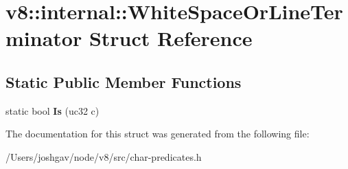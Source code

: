 \hypertarget{structv8_1_1internal_1_1_white_space_or_line_terminator}{}\section{v8\+:\+:internal\+:\+:White\+Space\+Or\+Line\+Terminator Struct Reference}
\label{structv8_1_1internal_1_1_white_space_or_line_terminator}
\subsection*{Static Public Member Functions}
\begin{DoxyCompactItemize}
\item 
static bool {\bfseries Is} (uc32 c)\hypertarget{structv8_1_1internal_1_1_white_space_or_line_terminator_a235e354b953caff6855bc64170378de1}{}\label{structv8_1_1internal_1_1_white_space_or_line_terminator_a235e354b953caff6855bc64170378de1}

\end{DoxyCompactItemize}


The documentation for this struct was generated from the following file\+:\begin{DoxyCompactItemize}
\item 
/\+Users/joshgav/node/v8/src/char-\/predicates.\+h\end{DoxyCompactItemize}

